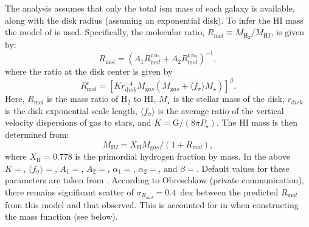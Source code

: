 The analysis assumes that only the total \gls{ism} mass of each galaxy is available, along with the disk radius (assuming an exponential disk). To infer the HI mass the model of \cite{obreschkow_simulation_2009} is used. Specifically, the molecular ratio, $R_{\mathrm mol}\equiv M_{\mathrm H_2}/M_{\mathrm HI}$, is given by:
\begin{equation}
 R_{\mathrm mol} = \left( A_1 R_{\mathrm mol}^{\mathrm c\,\alpha_1} + A_2 R_{\mathrm mol}^{\mathrm c\,\alpha_2} \right)^{-1},
 \label{eq:HIMassSystematic}
\end{equation}
where the ratio at the disk center is given by
\begin{equation}
 R_{\mathrm mol}^{\mathrm c} = [ K r_{\mathrm disk}^{-4} M_{\mathrm gas} (M_{\mathrm gas} + \langle f_\sigma \rangle M_\star)]^\beta.
\end{equation}
Here, $R_{\mathrm mol}$ is the mass ratio of H$_2$ to HI, $M_\star$ is the stellar mass of the disk, $r_{\mathrm disk}$ is the disk exponential scale length, $\langle f_\sigma \rangle$ is the average ratio of the vertical velocity dispersions of gas to stars, and $K={\mathrm G}/(8\pi P_\star)$. The HI mass is then determined from:
\begin{equation}
M_{\mathrm HI} = X_{\mathrm H} M_{\mathrm gas} / ( 1 + R_{\mathrm mol} ),
\end{equation}
where $X_{\mathrm H}=0.778$ is the primordial hydrogen fraction by mass. In the above $K=${\normalfont {}}, $\langle f_\sigma \rangle=${\normalfont {}}, $A_1=${\normalfont {}}, $A_2=${\normalfont {}}, $\alpha_1=${\normalfont {}}, $\alpha_2=${\normalfont {}}, and $\beta=${\normalfont {}}. Default values for these parameters are taken from \cite{obreschkow_simulation_2009}. According to Obreschkow (private communication), there remains significant scatter of $\sigma_{R_{\mathrm mol}}=0.4$~dex between the predicted $R_{\mathrm mol}$ from this model and that observed. This is accounted for in when constructing the mass function (see below).

